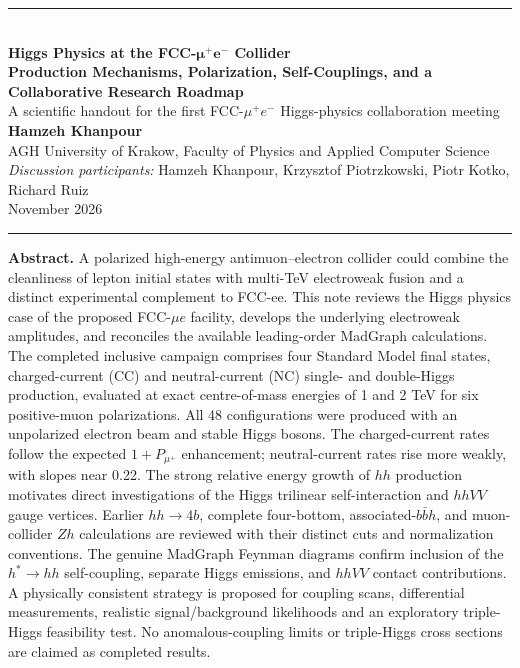 \documentclass[12pt,a4paper]{article}
\begin{document}

\begin{center}
{\color{aghgreen}\rule{\linewidth}{2pt}} \\ [6pt]
{\LARGE\bfseries Higgs Physics at the FCC-$\boldsymbol{\mu^+e^-}$ Collider} \\ [6pt]
{\large\bfseries Production Mechanisms, Polarization, Self-Couplings, and a Collaborative Research Roadmap} \\ [8pt]
{\normalsize A scientific handout for the first FCC-$\mu^+e^-$ Higgs-physics collaboration meeting} \\ [5pt]
{\bfseries Hamzeh Khanpour} \\
AGH University of Krakow, Faculty of Physics and Applied Computer Science \\
\emph{Discussion participants:} Hamzeh Khanpour, Krzysztof Piotrzkowski, Piotr Kotko, Richard Ruiz \\
November 2026 \\ [5pt]
{\color{aghred}\rule{0.4\linewidth}{1pt}}
\end{center}



\textbf{Abstract.}\; A polarized high-energy antimuon--electron collider could combine the 
cleanliness of lepton initial states with multi-TeV electroweak fusion and a distinct experimental 
complement to FCC-ee. This note reviews the Higgs physics case of the proposed FCC-$\mu e$ facility, 
develops the underlying electroweak amplitudes, and reconciles the available leading-order MadGraph 
calculations. The completed inclusive campaign comprises four Standard Model final states, 
charged-current (CC) and neutral-current (NC) single- and double-Higgs production, evaluated at 
exact centre-of-mass energies of 1 and 2 TeV for six positive-muon polarizations. All 48 configurations 
were produced with an unpolarized electron beam and stable Higgs bosons. The charged-current rates follow 
the expected $1+P_{\mu^+}$ enhancement; neutral-current rates rise more weakly, with slopes near 0.22. The 
strong relative energy growth of $hh$ production motivates direct investigations of the Higgs trilinear 
self-interaction and $hhVV$ gauge vertices. Earlier $hh\to4b$, complete four-bottom, associated-$b\bar b h$, 
and muon-collider $Zh$ calculations are reviewed with their distinct cuts and normalization conventions. 
The genuine MadGraph Feynman diagrams confirm inclusion of the $h^*\to hh$ self-coupling, separate Higgs 
emissions, and $hhVV$ contact contributions. A physically consistent strategy is proposed for coupling scans, 
differential measurements, realistic signal/background likelihoods and an exploratory triple-Higgs 
feasibility test. No anomalous-coupling limits or triple-Higgs cross sections are claimed as completed results. 
\end{document}
